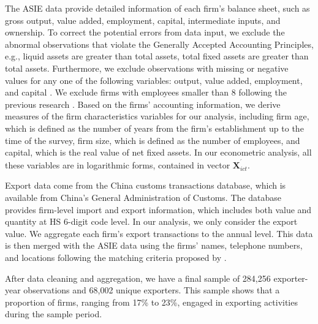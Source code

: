 \documentclass[12pt]{article}
\begin{document}
The ASIE data provide detailed information of each firm's balance sheet,
such as gross output, value added, employment, capital, intermediate inputs,
and ownership. To correct the potential errors from data input, we exclude the
abnormal observations that violate the Generally Accepted
Accounting Principles, e.g., liquid assets are greater than total assets, total
fixed assets are greater than total assets. Furthermore, we exclude observations with missing or negative values for any one of
the following variables: output, value added, employment, and capital \citep{cai2009competition,yu2015processing}. We
exclude firms with employees smaller than 8 following the previous research %
\citep{brandt2012creative}. Based on the firms' accounting information, we
derive measures of the firm characteristics variables for our analysis,
including firm age, which is defined as the number of years from the firm's
establishment up to the time of the survey, firm size, which is defined as
the number of employees, and capital, which is the real value of net fixed
assets. In our econometric analysis, all these variables are in logarithmic
forms, contained in vector $\mathbf{X}_{ict}^{^{\prime }}.$

Export data come from the China customs transactions database, which is available
from China's General Administration of Customs. The database provides
firm-level import and export information, which includes both value and
quantity at HS 6-digit code level. In our analysis, we only consider the export value. We aggregate each firm's export transactions to the annual level. This data is then merged with the ASIE data using the firms'
names, telephone numbers, and locations following the matching criteria proposed by \cite{yu2015processing}. 

After data cleaning and aggregation, we have a final sample of 284,256 exporter-year observations and 68,002 unique exporters. This sample shows that a proportion of firms, ranging from 17\% to 23\%, engaged in exporting activities during the sample period.
\end{document}
